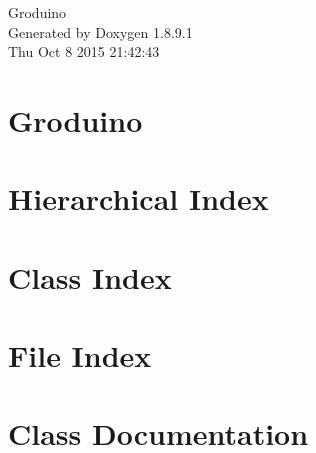 \documentclass[twoside]{book}
\newcommand{\+}{\discretionary{\mbox{\scriptsize$\hookleftarrow$}}{}{}}
\newcommand{\clearemptydoublepage}{%
  \newpage{\pagestyle{empty}\cleardoublepage}%
}
\begin{document}
\hypersetup{pageanchor=false,
             bookmarks=true,
             bookmarksnumbered=true,
             pdfencoding=unicode
            }
\begin{titlepage}
\vspace*{7cm}
\begin{center}%
{\Large Groduino }\\
\vspace*{1cm}
{\large Generated by Doxygen 1.8.9.1}\\
\vspace*{0.5cm}
{\small Thu Oct 8 2015 21:42:43}\\
\end{center}
\end{titlepage}
\clearemptydoublepage
\tableofcontents
\clearemptydoublepage
{}
\hypersetup{pageanchor=true}

\chapter{Groduino}
\label{index}\hypertarget{index}{}
\chapter{Hierarchical Index}

\chapter{Class Index}

\chapter{File Index}

\chapter{Class Documentation}














\end{document}
